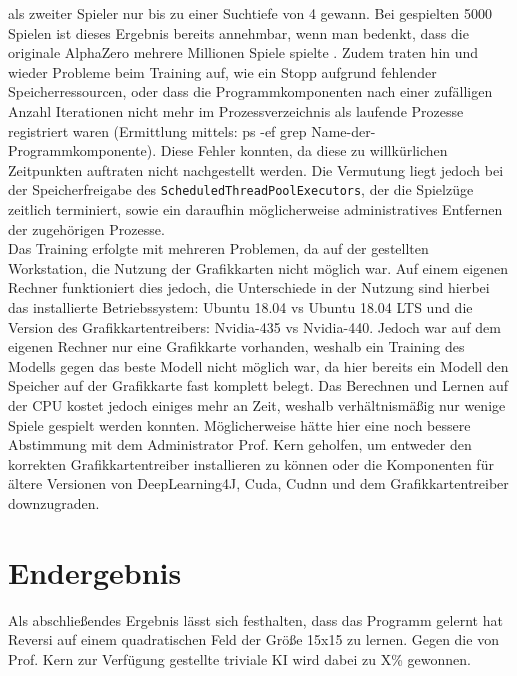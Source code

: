 \documentclass[12pt,a4paper]{article}
\begin{document}
als zweiter Spieler nur bis zu einer Suchtiefe von 4 gewann. Bei gespielten 5000 Spielen ist dieses Ergebnis bereits annehmbar, wenn man bedenkt, dass die originale AlphaZero mehrere Millionen Spiele spielte \cite{Silver2017}. Zudem traten hin und wieder Probleme beim Training auf, wie ein Stopp aufgrund fehlender Speicherressourcen, oder dass die Programmkomponenten nach einer zufälligen Anzahl Iterationen nicht mehr im Prozessverzeichnis als laufende Prozesse registriert waren (Ermittlung mittels: ps -ef\:  \textbar\: grep \glqq Name-der-Programmkomponente\grqq{}). Diese Fehler konnten, da diese zu willkürlichen Zeitpunkten auftraten nicht nachgestellt werden. Die Vermutung liegt jedoch bei der Speicherfreigabe des \texttt{ScheduledThreadPoolExecutors}, der die Spielzüge zeitlich terminiert, sowie ein daraufhin möglicherweise administratives Entfernen der zugehörigen Prozesse. \\
Das Training erfolgte mit mehreren Problemen, da auf der gestellten Workstation, die Nutzung der Grafikkarten nicht möglich war. Auf einem eigenen Rechner funktioniert dies jedoch, die Unterschiede in der Nutzung sind hierbei das installierte Betriebssystem: Ubuntu 18.04 vs Ubuntu 18.04 LTS und die Version des Grafikkartentreibers: Nvidia-435 vs Nvidia-440. Jedoch war auf dem eigenen Rechner nur eine Grafikkarte vorhanden, weshalb ein Training des Modells gegen das beste Modell nicht möglich war, da hier bereits ein Modell den Speicher auf der Grafikkarte fast komplett belegt. Das Berechnen und Lernen auf der CPU kostet jedoch einiges mehr an Zeit, weshalb verhältnismäßig nur wenige Spiele gespielt werden konnten. Möglicherweise hätte hier eine noch bessere Abstimmung mit dem Administrator Prof. Kern geholfen, um entweder den korrekten Grafikkartentreiber installieren zu können oder die Komponenten für ältere Versionen von DeepLearning4J, Cuda, Cudnn und dem Grafikkartentreiber downzugraden.

\newpage

\section{Endergebnis}
Als abschließendes Ergebnis lässt sich festhalten, dass das Programm gelernt hat Reversi auf einem quadratischen Feld der Größe 15x15 zu lernen. Gegen die von Prof. Kern zur Verfügung gestellte triviale KI wird dabei zu X\% gewonnen. 
\end{document}
